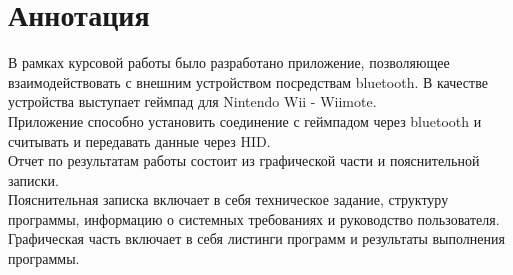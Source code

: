 \section*{Аннотация}
\raggedright
\quad В рамках курсовой работы было разработано приложение, позволяющее взаимодействовать с внешним устройством посредствам bluetooth.
В качестве устройства выступает геймпад для Nintendo\textsuperscript{\textregistered} Wii\textsuperscript{\textregistered} - Wiimote.\\
\quad Приложение способно установить соединение с геймпадом через bluetooth и считывать и передавать данные через HID.\\
\quad Отчет по результатам работы состоит из графической части и пояснительной записки.\\
Пояснительная записка включает в себя техническое задание, структуру программы, информацию о системных требованиях и руководство пользователя.
Графическая часть включает в себя листинги программ и результаты выполнения программы.
\newpage
